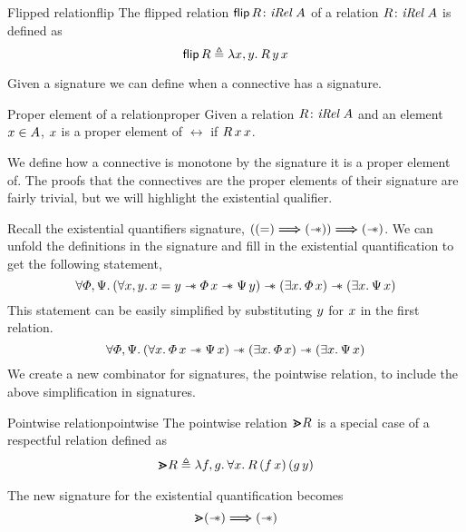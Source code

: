 \documentclass[thesis.tex]{subfiles}
\begin{document}
\begin{definition}{Flipped relation}{flip}
    The flipped relation $\bm{\textsf{\upshape flip}}\, R\colon\textit{iRel}\ A$ of a relation $R\colon\textit{iRel}\ A$ is defined as
    \[\flip\, \rel \eqdef \Lam \var, \varB. \rel\, \varB\, \var\]
\end{definition}
Given a signature we can define when a connective has a signature.
\begin{definition}{Proper element of a relation}{proper}
    Given a relation $R\colon\textit{iRel}\ A$ and an element $x\in A$, $x$ is a proper element of $\rel$ if $R\, x\, x$.
\end{definition}
We define how a connective is monotone by the signature it is a proper element of. The proofs that the connectives are the proper elements of their signature are fairly trivial, but we will highlight the existential qualifier.

Recall the existential quantifiers signature, $((=) \mathrel{\bm{\Longrightarrow}} (\mathrel{-\!\!\ast})) \mathrel{\bm{\Longrightarrow}} (\mathrel{-\!\!\ast})$. We can unfold the definitions in the signature and fill in the existential quantification to get the following statement,
\[\All \pred, \predB. (\All \var, \varB. \var = \varB \wand \pred\, \var \wand \predB\, \varB) \wand (\Exists \var. \pred\, \var) \wand (\Exists \var. \predB\, \var) \]
This statement can be easily simplified by substituting $y$ for $x$ in the first relation.
\[\All \pred, \predB. (\All \var. \pred\, \var \wand \predB\, \var) \wand (\Exists \var. \pred\, \var) \wand (\Exists \var. \predB\, \var) \]
We create a new combinator for signatures, the pointwise relation, to include the above simplification in signatures.
\begin{definition}{Pointwise relation}{pointwise}
    The pointwise relation $\bm{\gtrdot} R$ is a special case of a respectful relation defined as
    \begin{align*}
        \point \rel \eqdef \Lam \func, \funcB. \All \var. \rel\, (\func\, \var)\, (\funcB\, \varB)
    \end{align*}
\end{definition}
The new signature for the existential quantification becomes
\[\bm{\gtrdot} (\mathrel{-\!\!\ast}) \mathrel{\bm{\Longrightarrow}} (\mathrel{-\!\!\ast})\]
\end{document}

